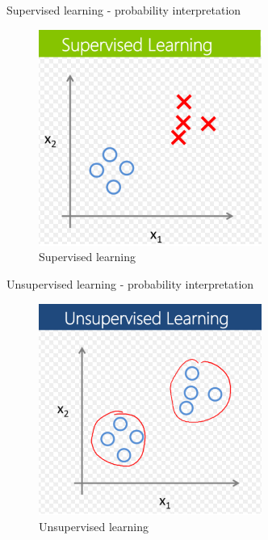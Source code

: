 \documentclass{beamer}
\begin{document}
\begin{frame}{ Supervised learning - probability interpretation }
\begin{figure}
  \centering
    \includegraphics[width=0.65\textwidth]{supervised_learning}
  		\caption{ Supervised learning }
    \label{addressingtask}
 \end{figure}
\end{frame}

\begin{frame}{ Unsupervised learning - probability interpretation }
\begin{figure}
  \centering
    \includegraphics[width=0.65\textwidth]{unsupervised_learning}
  		\caption{ Unsupervised learning }
    \label{addressingtask}
 \end{figure}
\end{frame}

\end{document}
